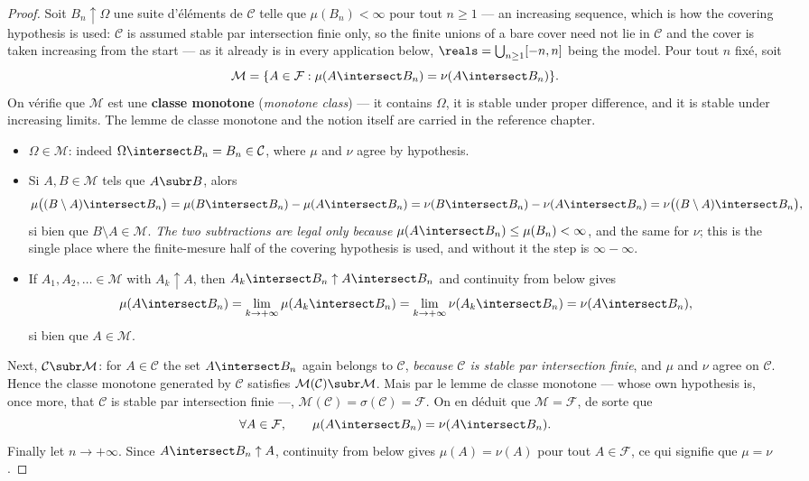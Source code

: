 \begin{proof}
  Soit $B_{n} \uparrow \Omega$ une suite d'éléments de $\mathcal{C}$ telle que
  $\mu(B_{n}) < \infty$ pour tout $n \geq 1$ --- an increasing sequence, which is how
  the covering hypothesis is used: $\mathcal{C}$ is assumed stable par intersection
  finie only, so the finite unions of a bare cover need not lie in $\mathcal{C}$ and
  the cover is taken increasing from the start --- as it already is in every
  application below, $\reals = \bigcup_{n \geq 1} [-n,n]$ being the model. Pour tout
  $n$ fixé, soit
  \[
    \mathcal{M} = \{A \in \mathcal{F} : \mu(A \intersect B_{n}) = \nu(A \intersect
    B_{n})\}.
  \]
  On vérifie que $\mathcal{M}$ est une \textbf{classe monotone} (\textit{monotone
  class}) --- it contains $\Omega$, it is stable under proper difference, and it
  is stable under increasing limits. The lemme de classe monotone and the notion
  itself are carried in the reference chapter.
  \begin{itemize}
    \item $\Omega \in \mathcal{M}$: indeed $\Omega \intersect B_{n} = B_{n} \in
      \mathcal{C}$, where $\mu$ and $\nu$ agree by hypothesis.
    \item Si $A, B \in \mathcal{M}$ tels que $A \subr B$, alors
      \[
        \mu\bigl((B \setminus A) \intersect B_{n}\bigr)
        = \mu(B \intersect B_{n}) - \mu(A \intersect B_{n})
        = \nu(B \intersect B_{n}) - \nu(A \intersect B_{n})
        = \nu\bigl((B \setminus A) \intersect B_{n}\bigr),
      \]
      si bien que $B \setminus A \in \mathcal{M}$. \emph{The two subtractions are
      legal only because $\mu(A \intersect B_{n}) \leq \mu(B_{n}) < \infty$}, and the
      same for $\nu$; this is the single place where the finite-mesure half of the
      covering hypothesis is used, and without it the step is $\infty - \infty$.
    \item If $A_{1}, A_{2}, \ldots \in \mathcal{M}$ with $A_{k} \uparrow A$, then
      $A_{k} \intersect B_{n} \uparrow A \intersect B_{n}$ and continuity from below
      gives
      \[
        \mu(A \intersect B_{n}) = \lim_{k \to +\infty} \mu(A_{k} \intersect B_{n})
        = \lim_{k \to +\infty} \nu(A_{k} \intersect B_{n})
        = \nu(A \intersect B_{n}),
      \]
      si bien que $A \in \mathcal{M}$.
  \end{itemize}
  Next, $\mathcal{C} \subr \mathcal{M}$: for $A \in \mathcal{C}$ the set $A
  \intersect B_{n}$ again belongs to $\mathcal{C}$, \emph{because $\mathcal{C}$ is
  stable par intersection finie}, and $\mu$ and $\nu$ agree on $\mathcal{C}$.
  Hence the classe monotone generated by $\mathcal{C}$ satisfies $\mathcal{M}(
  \mathcal{C}) \subr \mathcal{M}$. Mais par le lemme de classe monotone --- whose own
  hypothesis is, once more, that $\mathcal{C}$ is stable par intersection finie
  ---, $\mathcal{M}(\mathcal{C}) = \sigma(\mathcal{C}) = \mathcal{F}$. On en déduit
  que $\mathcal{M} = \mathcal{F}$, de sorte que
  \[
    \forall A \in \mathcal{F}, \qquad \mu(A \intersect B_{n}) = \nu(A \intersect
    B_{n}).
  \]
  Finally let $n \to +\infty$. Since $A \intersect B_{n} \uparrow A$, continuity from
  below gives $\mu(A) = \nu(A)$ pour tout $A \in \mathcal{F}$, ce qui signifie que
  $\mu = \nu$.
\end{proof}

